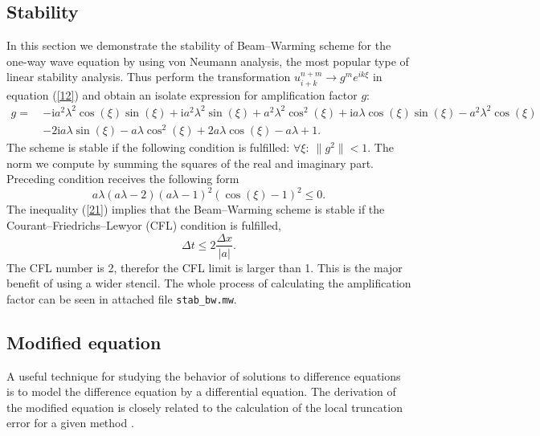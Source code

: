 \documentclass[a4paper, 10pt]{article}
\begin{document}
\subsection{Stability}
In this section we demonstrate the stability of Beam--Warming scheme for the one-way wave equation by using von Neumann analysis, the most popular type of linear stability analysis. Thus perform the transformation $ u_{i+k}^{n+m} \rightarrow g^m e^{ik\xi} $ in equation (\ref{12}) and obtain an isolate expression for amplification factor $ g $:
\begin{equation}
\begin{split}
\label{20}
g = \:& -\mathrm{i} a^2 \lambda^2 \cos(\xi) \sin(\xi) + \mathrm{i} a^2 \lambda^2 \sin(\xi) + a^2 \lambda^2 \cos^2(\xi) + \mathrm{i} a \lambda \cos(\xi) \sin(\xi) - a^2 \lambda^2 \cos(\xi)\\ 
& - 2 \mathrm{i} a \lambda \sin(\xi) - a \lambda \cos^2(\xi) + 2 a \lambda \cos(\xi) - a \lambda + 1.
\end{split}
\end{equation}
The scheme is stable if the following condition is fulfilled: $ \forall \xi : \: \| g^2 \| < 1 $. The norm we compute by summing the squares of the real and imaginary part. Preceding condition receives the following form
\begin{equation}
\label{21}
a \lambda (a \lambda - 2) (a \lambda - 1)^2 (\cos(\xi) - 1)^2 \leq 0.
\end{equation}
The inequality (\ref{21}) implies that the Beam--Warming scheme is stable if the Courant--Friedrichs--Lewyor (CFL) condition is fulfilled,
\begin{equation}
\label{22}
\Delta t \leq 2 \frac{\Delta x}{| a |}.
\end{equation}
The CFL number is 2, therefor the CFL limit is larger than 1. This is the major benefit of using a wider stencil. The whole process of calculating the amplification factor can be seen in attached file \texttt{stab\_bw.mw}.

\subsection{Modified equation}
A useful technique for studying the behavior of solutions to difference equations is to model the difference equation by a differential equation. The derivation of the modified equation is closely related to the calculation of the local truncation error for a given method \cite{leveque}.\\
\end{document}
